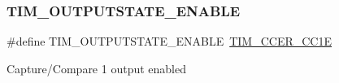 \subsubsection{\texorpdfstring{TIM\_OUTPUTSTATE\_ENABLE}{TIM\_OUTPUTSTATE\_ENABLE}}
{\footnotesize\ttfamily \#define T\+I\+M\+\_\+\+O\+U\+T\+P\+U\+T\+S\+T\+A\+T\+E\+\_\+\+E\+N\+A\+B\+LE~\mbox{\hyperlink{group___peripheral___registers___bits___definition_ga3f494b9881e7b97bb2d79f7ad4e79937}{T\+I\+M\+\_\+\+C\+C\+E\+R\+\_\+\+C\+C1E}}}

Capture/\+Compare 1 output enabled 